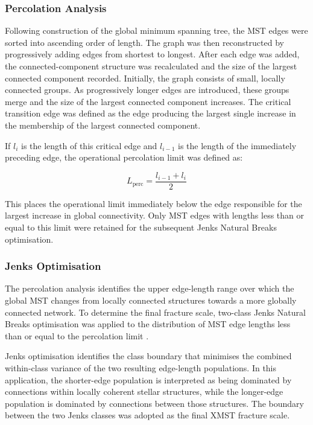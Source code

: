 \documentclass[fleqn,usenatbib]{mnras}
\begin{document}
\subsubsection{Percolation Analysis}
Following construction of the global minimum spanning tree, the MST edges were sorted into ascending order of length. The graph was then reconstructed by progressively adding edges from shortest to longest. After each edge was added, the connected-component structure was recalculated and the size of the largest connected component recorded.
Initially, the graph consists of small, locally connected groups. As progressively longer edges are introduced, these groups merge and the size of the largest connected component increases. The critical transition edge was defined as the edge producing the largest single increase in the membership of the largest connected component.

If $l_i$ is the length of this critical edge and $l_{i-1}$ is the length of the immediately preceding edge, the operational percolation limit was defined as:

\begin{equation}
L_{\mathrm{perc}} = \frac{l_{i-1} + l_i}{2}
\end{equation}

This places the operational limit immediately below the edge responsible for the largest increase in global connectivity. Only MST edges with lengths less than or equal to this limit were retained for the subsequent Jenks Natural Breaks optimisation.

\subsubsection{Jenks Optimisation}
The percolation analysis identifies the upper edge-length range over which the global MST changes from locally connected structures towards a more globally connected network. To determine the final fracture scale, two-class Jenks Natural Breaks optimisation was applied to the distribution of MST edge lengths less than or equal to the percolation limit \citep{Jenks1967}.

Jenks optimisation identifies the class boundary that minimises the combined within-class variance of the two resulting edge-length populations. In this application, the shorter-edge population is interpreted as being dominated by connections within locally coherent stellar structures, while the longer-edge population is dominated by connections between those structures. The boundary between the two Jenks classes was adopted as the final XMST fracture scale. 
\end{document}
